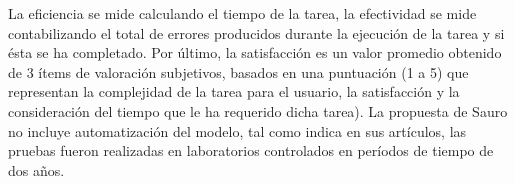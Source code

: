 
La eficiencia se mide calculando el tiempo de la tarea, la efectividad se mide contabilizando el total de errores producidos durante la ejecución de la tarea y si ésta se ha completado. Por último, la satisfacción es un valor promedio obtenido de 3 ítems de valoración subjetivos, basados en una puntuación (1 a 5) que representan la complejidad de la tarea para el usuario, la satisfacción y la consideración del tiempo que le ha requerido dicha tarea). 
La propuesta de Sauro no incluye automatización del modelo, tal como indica en sus artículos, las pruebas fueron realizadas en laboratorios controlados en períodos de tiempo de dos años. 
